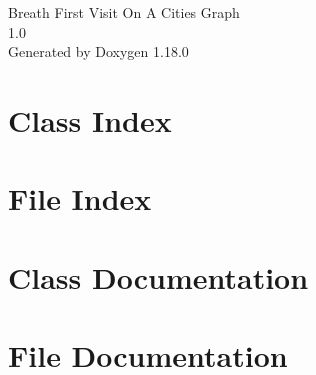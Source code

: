 \documentclass[twoside]{book}
\newcommand{\+}{\discretionary{\mbox{\scriptsize$\hookleftarrow$}}{}{}}
\newcommand{\clearemptydoublepage}{%
    \newpage{\pagestyle{empty}\cleardoublepage}%
  }
\begin{document}
  \raggedbottom
    \hypersetup{pageanchor=false,
                bookmarksnumbered=true,
                pdfencoding=unicode
               }
  \begin{titlepage}
  \vspace*{7cm}
  \begin{center}%
  {\Large Breath First Visit On A Cities Graph}\\
  [1ex]\large 1.\+0 \\
  \vspace*{1cm}
  {\large Generated by Doxygen 1.18.0}\\
  \end{center}
  \end{titlepage}
  \clearemptydoublepage
  \tableofcontents
  \clearemptydoublepage
  \hypersetup{pageanchor=true}
\chapter{Class Index}

\chapter{File Index}

\chapter{Class Documentation}




\chapter{File Documentation}















  \backmatter
  \newpage
  \clearemptydoublepage
  \printindex
\end{document}
